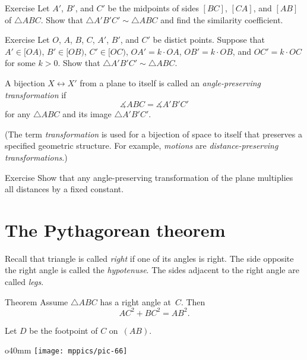 \begin{thm}{Exercise}\label{ex:mid-triangle}
Let $A'$, $B'$, and $C'$ be the midpoints of sides $[BC]$, $[CA]$, and $[AB]$ of $\triangle ABC$.
Show that $\triangle A'B'C'\sim\triangle ABC$ and find the similarity coefficient.
\end{thm}

\begin{thm}{Exercise}\label{ex:k*triangle}
Let $O$, $A$, $B$, $C$, $A'$, $B'$, and $C'$ be distict points.
Suppose that $A'\in [OA)$, $B'\in[OB)$, $C'\in [OC)$, $OA'=k\cdot OA$, $OB'=k\cdot OB$, and $OC'=k\cdot OC$ for some $k>0$.
Show that $\triangle A'B'C'\sim\triangle ABC$.
\end{thm}

A bijection $X\leftrightarrow X'$ from a plane to itself is called an \emph{angle-preserving transformation} if 
\[\measuredangle ABC= \measuredangle A'B'C'\]
for any $\triangle ABC$ and its image $\triangle A'B'C'$.

(The term \emph{transformation} is used for a bijection of space to itself that preserves a specified geometric structure.
For example, {}\emph{motions} are \textit{distance-preserving transformations}.)


\begin{thm}{Exercise}\label{ex:angle-preserving-euclid}
Show that any angle-preserving transformation of the plane multiplies all distances by a ﬁxed constant.
\end{thm}

\section{The Pythagorean theorem}

Recall that triangle is called \emph{right} if one of its angles is right.
The side opposite the right angle is called the \emph{hypotenuse}. 
The sides adjacent to the right angle are called \emph{legs}. 


\begin{thm}{Theorem}\label{thm:pyth}
Assume $\triangle ABC$ has a right angle at~$C$.
Then
$$AC^2+BC^2=AB^2.$$ 

\end{thm}

Let $D$ be the footpoint of $C$ on~$(AB)$.

\begin{wrapfigure}[4]{o}{40mm}
\vskip-2mm
\centering
\texttt{[image: mppics/pic-66]}
\end{wrapfigure}

